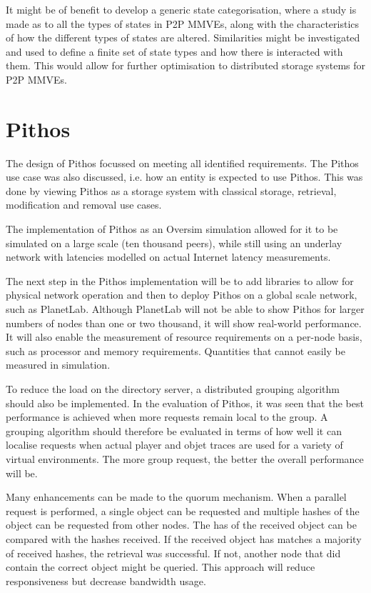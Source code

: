 It might be of benefit to develop a generic state categorisation, where a study is made as to all the types of states in P2P MMVEs, along with the characteristics of how the different types of states are altered. Similarities might be investigated and used to define a finite set of state types and how there is interacted with them. This would allow for further optimisation to distributed storage systems for P2P MMVEs.

\section{Pithos}

The design of Pithos focussed on meeting all identified requirements. The Pithos use case was also discussed, i.e. how an entity is expected to use Pithos. This was done by viewing Pithos as a storage system with classical storage, retrieval, modification and removal use cases.

The implementation of Pithos as an Oversim simulation allowed for it to be simulated on a large scale (ten thousand peers), while still using an underlay network with latencies modelled on actual Internet latency measurements.

The next step in the Pithos implementation will be to add libraries to allow for physical network operation and then to deploy Pithos on a global scale network, such as PlanetLab. Although PlanetLab will not be able to show Pithos for larger numbers of nodes than one or two thousand, it will show real-world performance.  It will also enable the measurement of resource requirements on a per-node basis, such as processor and memory requirements. Quantities that cannot easily be measured in simulation.

To reduce the load on the directory server, a distributed grouping algorithm should also be implemented. In the evaluation of Pithos, it was seen that the best performance is achieved when more requests remain local to the group. A grouping algorithm should therefore be evaluated in terms of how well it can localise requests when actual player and objet traces are used for a variety of virtual environments. The more group request, the better the overall performance will be.

Many enhancements can be made to the quorum mechanism. When a parallel request is performed, a single object can be requested and multiple hashes of the object can be requested from other nodes. The has of the received object can be compared with the hashes received. If the received object has matches a majority of received hashes, the retrieval was successful. If not, another node that did contain the correct object might be queried. This approach will reduce responsiveness but decrease bandwidth usage.

